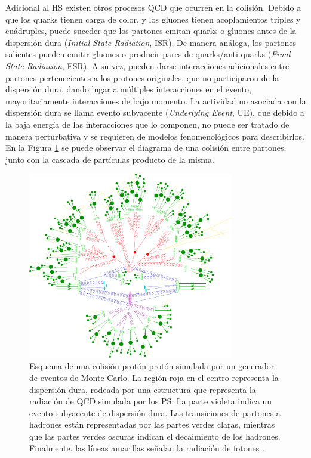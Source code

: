 Adicional al HS existen otros procesos QCD que ocurren en la colisión. Debido a que los quarks tienen carga de color, y los gluones tienen acoplamientos triples y cuádruples, puede suceder que los partones emitan quarks o gluones antes de la dispersión dura (\textit{Initial State Radiation}, ISR). De manera análoga, los partones salientes pueden emitir gluones o
producir pares de quarks/anti-quarks (\textit{Final State Radiation}, FSR). A su vez, pueden darse interacciones adicionales entre partones pertenecientes a los protones originales, que no participaron de la dispersión dura, dando lugar a múltiples
interacciones en el evento, mayoritariamente interacciones de bajo momento. La actividad no asociada con la dispersión dura se llama evento subyacente
(\textit{Underlying Event}, UE), que debido a la baja energía de las interacciones que lo
componen, no puede ser tratado de manera perturbativa y se requieren de modelos
fenomenológicos para describirlos. En la Figura \ref{fig:mc_qcd} se puede observar el diagrama de una colisión entre partones, junto con la cascada de partículas producto de la misma.

\begin{figure}
  \centering
  \includegraphics[width=0.8\textwidth]{images/lhc/mc_qcd.pdf}
  \caption{Esquema de una colisión protón-protón simulada por un generador de
eventos de Monte Carlo. La región roja en el centro representa la dispersión dura,
rodeada por una estructura que representa la radiación de QCD
simulada por los PS. La parte violeta indica un evento subyacente 
de dispersión dura. Las transiciones de partones a hadrones están representadas
por las partes verdes claras, mientras que las partes verdes oscuras indican el 
decaimiento de los hadrones. Finalmente, las líneas amarillas señalan la radiación de
fotones \cite{mc_simulation}.}
\label{fig:mc_qcd}
\end{figure}


